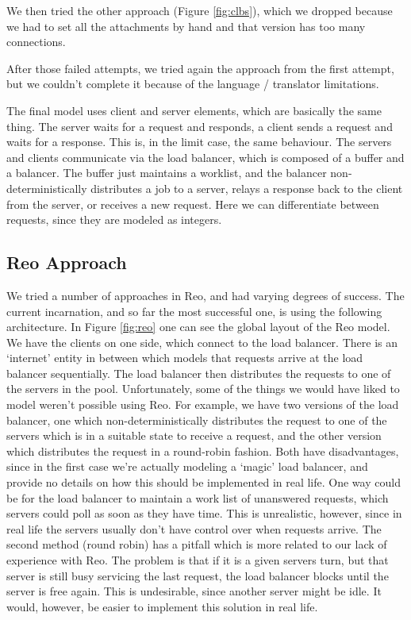 \documentclass[a4paper]{article}
\newcommand{\re}{Reo\xspace}
\begin{document}
We then tried the other approach (Figure \ref{fig:clbs}), which we dropped because we had to set all
the attachments by hand and that version has too many connections.

After those failed attempts, we tried again the approach from the first
attempt, but we couldn't complete it because of the language / translator
limitations.

The final model uses client and server elements, which are basically the same
thing. The server waits for a request and responds, a client sends a request and
waits for a response. This is, in the limit case, the same behaviour. The
servers and clients communicate via the load balancer, which is composed of a
buffer and a balancer. The buffer just maintains a worklist, and the balancer
non-deterministically distributes a job to a server, relays a response back to
the client from the server, or receives a new request. Here we can differentiate
between requests, since they are modeled as integers. 


\subsection{\re Approach}

We tried a number of approaches in \re, and had varying degrees of success. The
current incarnation, and so far the most successful one, is using the following
architecture. In Figure \ref{fig:reo} one can see the global layout of the \re
model. We have the clients on one side, which connect to the load balancer.
There is an `internet' entity in between which models that requests arrive at
the load balancer sequentially. The load balancer then distributes the requests
to one of the servers in the pool. Unfortunately, some of the things we would
have liked to model weren't possible using \re. For example, we have two
versions of the load balancer, one which non-deterministically distributes the
request to one of the servers which is in a suitable state to receive a request,
and the other version which distributes the request in a round-robin fashion.
Both have disadvantages, since in the first case we're actually modeling a
`magic' load balancer, and provide no details on how this should be implemented
in real life. One way could be for the load balancer to maintain a work list of
unanswered requests, which servers could poll as soon as they have time. This is
unrealistic, however, since in real life the servers usually don't have control
over when requests arrive. The second method (round robin) has a pitfall which
is more related to our lack of experience with \re. The problem is that if it is a
given servers turn, but that server is still busy servicing the last request,
the load balancer blocks until the server is free again. This is undesirable,
since another server might be idle. It would, however, be easier to implement
this solution in real life.
\end{document}
